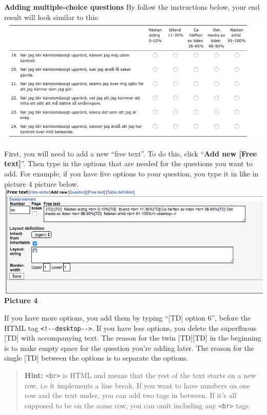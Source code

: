 \documentclass[]{book}
\begin{document}
\textbf{Adding multiple-choice questions}
By follow the instructions below, your end result will look similar to this:
\includegraphics{images/new-images/multiplechoiceQ.png}

First, you will need to add a new ``free text''. To do this, click ``\textbf{Add new {[}Free text{]}}''. Then type in the options that are needed for the questions you want to add. For example, if you have five options to your question, you type it in like in picture 4 picture below.
\includegraphics{images/new-images/multiplechoiceFreeText.png}
\textbf{Picture 4}

If you have more options, you add them by typing ``{[}TD{]} option 6'', before the HTML tag \texttt{\textless{}!-\/-desktop-\/-\textgreater{}}. If you have less options, you delete the superfluous {[}TD{]} with accompanying text. The reason for the twin {[}TD{]}{[}TD{]} in the beginning is to make empty space for the question you're adding later. The reason for the single {[}TD{]} between the options is to separate the options.

\begin{quote}
\textbf{Hint:} \texttt{\textless{}br\textgreater{}} is HTML and means that the rest of the text starts on a new row, i.e it implements a line break. If you want to have numbers on one row and the text under, you can add two tags in between. If it's all supposed to be on the same row, you can omit including any \texttt{\textless{}br\textgreater{}} tags.
\end{quote}
\end{document}
